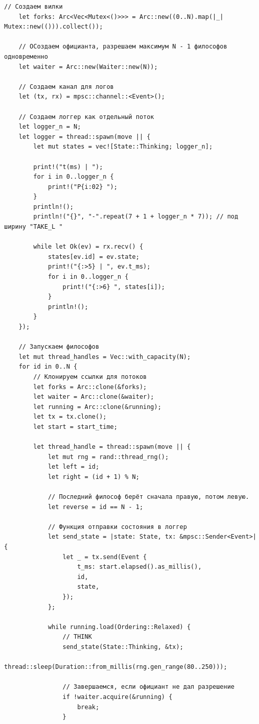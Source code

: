 \documentclass[a4paper, 14pt]{extarticle}
\begin{document}
\begin{lstlisting}[caption={Исходный код программы}, label={lst:source_code}]
    // Создаем вилки
    let forks: Arc<Vec<Mutex<()>>> = Arc::new((0..N).map(|_| Mutex::new(())).collect());

    // ОСоздаем официанта, разрешаем максимум N - 1 философов одновременно
    let waiter = Arc::new(Waiter::new(N));

    // Создаем канал для логов
    let (tx, rx) = mpsc::channel::<Event>();

    // Создаем логгер как отдельный поток
    let logger_n = N;
    let logger = thread::spawn(move || {
        let mut states = vec![State::Thinking; logger_n];

        print!("t(ms) | ");
        for i in 0..logger_n {
            print!("P{i:02} ");
        }
        println!();
        println!("{}", "-".repeat(7 + 1 + logger_n * 7)); // под ширину "TAKE_L "

        while let Ok(ev) = rx.recv() {
            states[ev.id] = ev.state;
            print!("{:>5} | ", ev.t_ms);
            for i in 0..logger_n {
                print!("{:>6} ", states[i]);
            }
            println!();
        }
    });

    // Запускаем философов
    let mut thread_handles = Vec::with_capacity(N);
    for id in 0..N {
        // Клонируем ссылки для потоков
        let forks = Arc::clone(&forks);
        let waiter = Arc::clone(&waiter);
        let running = Arc::clone(&running);
        let tx = tx.clone();
        let start = start_time;

        let thread_handle = thread::spawn(move || {
            let mut rng = rand::thread_rng();
            let left = id;
            let right = (id + 1) % N;

            // Последний философ берёт сначала правую, потом левую.
            let reverse = id == N - 1;

            // Функция отправки состояния в логгер
            let send_state = |state: State, tx: &mpsc::Sender<Event>| {
                let _ = tx.send(Event {
                    t_ms: start.elapsed().as_millis(),
                    id,
                    state,
                });
            };

            while running.load(Ordering::Relaxed) {
                // THINK
                send_state(State::Thinking, &tx);
                thread::sleep(Duration::from_millis(rng.gen_range(80..250)));

                // Завершаемся, если официант не дал разрешение
                if !waiter.acquire(&running) {
                    break;
                }


\end{lstlisting}
\end{document}
